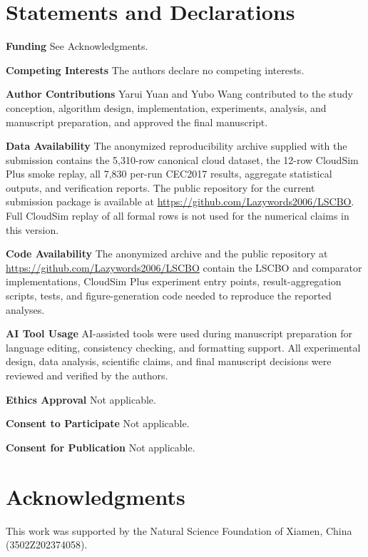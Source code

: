 \documentclass[pdflatex,onecolumn,sn-mathphys-num]{sn-jnl}
\begin{document}
\section*{Statements and Declarations}
\textbf{Funding} See Acknowledgments.

\textbf{Competing Interests} The authors declare no competing interests.

\textbf{Author Contributions} Yarui Yuan and Yubo Wang contributed to the study conception, algorithm design, implementation, experiments, analysis, and manuscript preparation, and approved the final manuscript.

\textbf{Data Availability} The anonymized reproducibility archive supplied with the submission contains the 5,310-row canonical cloud dataset, the 12-row CloudSim Plus smoke replay, all 7,830 per-run CEC2017 results, aggregate statistical outputs, and verification reports. The public repository for the current submission package is available at \url{https://github.com/Lazywords2006/LSCBO}. Full CloudSim replay of all formal rows is not used for the numerical claims in this version.

\textbf{Code Availability} The anonymized archive and the public repository at \url{https://github.com/Lazywords2006/LSCBO} contain the LSCBO and comparator implementations, CloudSim Plus experiment entry points, result-aggregation scripts, tests, and figure-generation code needed to reproduce the reported analyses.

\textbf{AI Tool Usage} AI-assisted tools were used during manuscript preparation for language editing, consistency checking, and formatting support. All experimental design, data analysis, scientific claims, and final manuscript decisions were reviewed and verified by the authors.

\textbf{Ethics Approval} Not applicable.

\textbf{Consent to Participate} Not applicable.

\textbf{Consent for Publication} Not applicable.

\section*{Acknowledgments}
This work was supported by the Natural Science Foundation of Xiamen, China (3502Z202374058).
\end{document}
